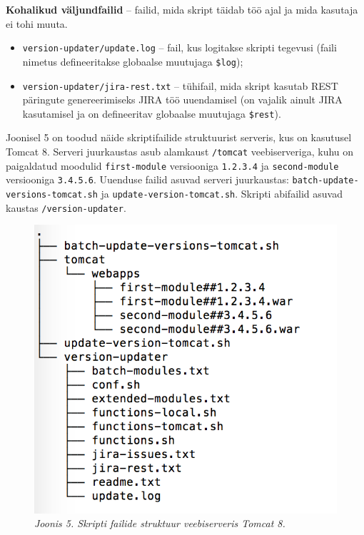 \documentclass[12pt]{article}
\newcommand{\code}[1]{\texttt{#1}}
\begin{document}
  \textbf{Kohalikud väljundfailid} \--- failid, mida skript täidab töö ajal ja mida kasutaja ei tohi muuta.
  
  \begin{itemize}
    \item \code{version-updater/update.log} \--- fail, kus logitakse skripti tegevusi (faili nimetus defineeritakse globaalse muutujaga \code{\$log});
    \item \code{version-updater/jira-rest.txt} \--- tühifail, mida skript kasutab REST \cite{rest} päringute genereerimiseks JIRA töö uuendamisel \cite{jira} (on vajalik ainult JIRA kasutamisel ja on defineeritav globaalse muutujaga \code{\$rest}).
  \end{itemize}
  
  \newpage
  
  Joonisel 5 on toodud näide skriptifailide struktuurist serveris, kus on kasutusel Tomcat 8. Serveri juurkaustas asub alamkaust \code{/tomcat} veebiserveriga, kuhu on paigaldatud moodulid \code{first-module} versiooniga \code{1.2.3.4} ja \code{second-module} versiooniga \code{3.4.5.6}. Uuenduse failid asuvad serveri juurkaustas: \code{batch-update-versions-tomcat.sh} ja \code{update-version-tomcat.sh}. Skripti abifailid asuvad kaustas \code{/version-updater}.
  
  \begin{figure}[H] 
    \begin{center}
      \includegraphics{screenshots/file-structure-on-tomcat.png}
      \caption*{\textit{Joonis 5. Skripti failide struktuur veebiserveris Tomcat 8.}}
      \end{center}
   \end{figure}
   
\end{document}

